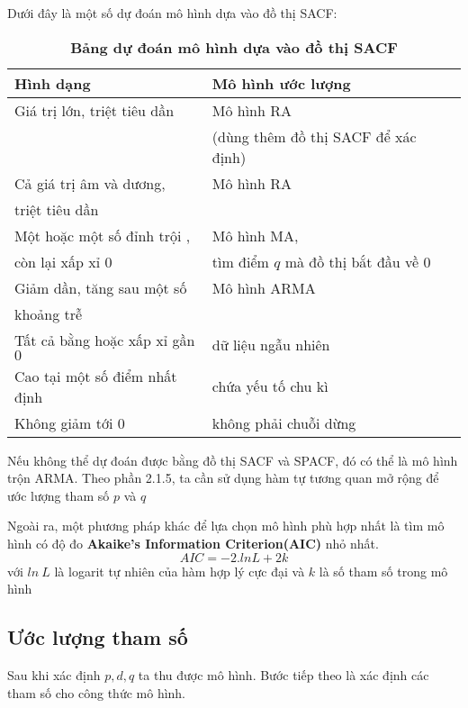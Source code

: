 Dưới đây là một số dự đoán mô hình dựa vào đồ thị SACF:
\begin{table}[htdp]
\centering
\begin{tabular}{|l|l|l|} %
\hline
{\bf Hình dạng} & {\bf Mô hình ước lượng}  \\ 
\hline %

Giá trị lớn, triệt tiêu dần & Mô hình RA \\
$\qquad$&(dùng thêm đồ thị SACF để xác định)  \\ \hline
Cả giá trị âm và dương, &Mô hình RA\\ 
triệt tiêu dần & $\qquad$  \\\hline
Một hoặc một số đỉnh trội , & Mô hình MA,\\
còn lại xấp xỉ 0& tìm điểm $q$ mà đồ thị bắt đầu về 0 \\ \hline
Giảm dần, tăng sau một số  & Mô hình ARMA \\
khoảng trễ& $\qquad$ \\ \hline
Tất cả bằng hoặc xấp xỉ gần $0$ & dữ liệu ngẫu nhiên \\ \hline
Cao tại một số điểm nhất định & chứa yếu tố chu kì \\ \hline
Không giảm tới 0 & không phải chuỗi dừng \\ \hline
\end{tabular}
\caption[Bảng dự đoán mô hình dựa vào đồ thị SACF]{\textbf{Bảng dự đoán mô hình dựa vào đồ thị SACF}}
\label{fcpq} %
\end{table}

Nếu không thể dự đoán được bằng đồ thị SACF và SPACF, đó có thể là mô hình trộn ARMA. Theo phần 2.1.5, ta cần sử dụng hàm tự tương quan mở rộng để ước lượng tham số $p$ và $q$

Ngoài ra, một phương pháp khác để lựa chọn mô hình phù hợp nhất là tìm mô hình có độ đo \textbf{Akaike’s Information Criterion(AIC)}\cite{aka73} nhỏ nhất. 
\begin{equation}
	AIC = -2.lnL + 2k
\end{equation}
với $ln~L$ là logarit tự nhiên của hàm hợp lý cực đại và $k$ là số tham số trong mô hình
\subsection{Ước lượng tham số}
Sau khi xác định $p,d,q$ ta thu được mô hình. Bước tiếp theo là xác định các tham số cho công thức mô hình.
